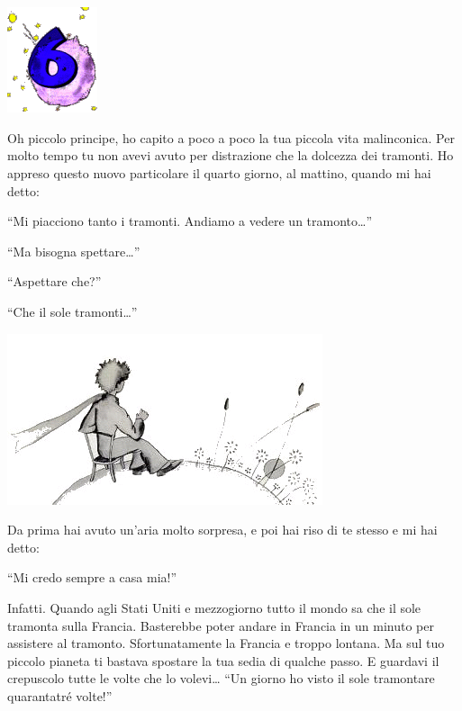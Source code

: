 \documentclass[11pt]{scrbook}
\begin{document}
\chapter{}
\begin{center}
\includegraphics{img/chapter6}
\end{center}

Oh piccolo principe, ho capito a poco a poco la tua piccola vita
malinconica. Per molto tempo tu non avevi avuto per distrazione che la
dolcezza dei tramonti. Ho appreso questo nuovo particolare il quarto
giorno, al mattino, quando mi hai detto:

``Mi piacciono tanto i tramonti. Andiamo a vedere un tramonto\ldots{}''

``Ma bisogna spettare\ldots{}''

``Aspettare che?''

``Che il sole tramonti\ldots{}''

\begin{center}
\includegraphics{img/6a}
\end{center}

Da prima hai avuto un'aria molto sorpresa, e poi hai riso di te stesso e
mi hai detto:

``Mi credo sempre a casa mia!''

Infatti. Quando agli Stati Uniti e mezzogiorno tutto il mondo sa che il
sole tramonta sulla Francia. Basterebbe poter andare in Francia in un
minuto per assistere al tramonto. Sfortunatamente la Francia e troppo
lontana. Ma sul tuo piccolo pianeta ti bastava spostare la tua sedia di
qualche passo. E guardavi il crepuscolo tutte le volte che lo
volevi\ldots{} ``Un giorno ho visto il sole tramontare quarantatré
volte!''
\end{document}
